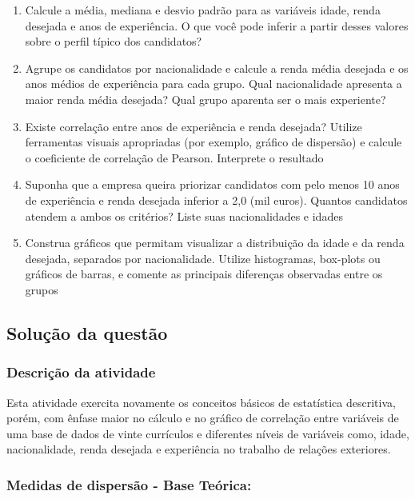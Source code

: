 \documentclass[a4paper,11pt]{article}
\begin{document}
\begin{enumerate}[leftmargin=*]
\item Calcule a média, mediana e desvio padrão para as variáveis idade, renda desejada e
anos de experiência. O que você pode inferir a partir desses valores sobre o perfil típico dos candidatos?

\item  Agrupe os candidatos por nacionalidade e calcule a renda média desejada e os anos
médios de experiência para cada grupo. Qual nacionalidade apresenta a maior renda
média desejada? Qual grupo aparenta ser o mais experiente?

\item Existe correlação entre anos de experiência e renda desejada? Utilize ferramentas visuais apropriadas (por exemplo, gráfico de dispersão) e calcule o coeficiente de correlação
de Pearson. Interprete o resultado

\item Suponha que a empresa queira priorizar candidatos com pelo menos 10 anos de experiência e renda desejada inferior a 2,0 (mil euros). Quantos candidatos atendem a ambos
os critérios? Liste suas nacionalidades e idades

\item Construa gráficos que permitam visualizar a distribuição da idade e da renda desejada,
separados por nacionalidade. Utilize histogramas, box-plots ou gráficos de barras, e
comente as principais diferenças observadas entre os grupos

\end{enumerate}

\subsection*{Solução da questão} 		

\subsubsection*{Descrição da atividade}
Esta atividade exercita novamente os conceitos básicos de estatística descritiva, porém, com ênfase maior no cálculo e no gráfico de correlação entre variáveis de uma base de dados de vinte currículos e diferentes níveis de variáveis como, idade, nacionalidade, renda desejada e experiência no trabalho de relações exteriores.

\subsubsection*{Medidas de dispersão - Base Teórica:} 
\end{document}
